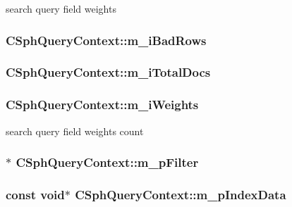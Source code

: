 search query field weights 

\hypertarget{classCSphQueryContext_a09e4f76edfe5453c46d72873b694cfff}{
\subsubsection[{m\-\_\-i\-Bad\-Rows}]{ C\-Sph\-Query\-Context\-::m\-\_\-i\-Bad\-Rows}}\label{classCSphQueryContext_a09e4f76edfe5453c46d72873b694cfff}
\hypertarget{classCSphQueryContext_ac04374526c69e45a7bc7a0547e9cb153}{
\subsubsection[{m\-\_\-i\-Total\-Docs}]{ C\-Sph\-Query\-Context\-::m\-\_\-i\-Total\-Docs}}\label{classCSphQueryContext_ac04374526c69e45a7bc7a0547e9cb153}
\hypertarget{classCSphQueryContext_a02ad4d2f26c2e5bea1c44343aab35284}{
\subsubsection[{m\-\_\-i\-Weights}]{ C\-Sph\-Query\-Context\-::m\-\_\-i\-Weights}}\label{classCSphQueryContext_a02ad4d2f26c2e5bea1c44343aab35284}


search query field weights count 

\hypertarget{classCSphQueryContext_a64ea660caf0c74b4416b30ea4faaa656}{
\subsubsection[{m\-\_\-p\-Filter}]{$\ast$ C\-Sph\-Query\-Context\-::m\-\_\-p\-Filter}}\label{classCSphQueryContext_a64ea660caf0c74b4416b30ea4faaa656}
\hypertarget{classCSphQueryContext_a57d27f825ca837d923ec7ef70fde7bd2}{
\subsubsection[{m\-\_\-p\-Index\-Data}]{\setlength{\rightskip}{0pt plus 5cm}const void$\ast$ C\-Sph\-Query\-Context\-::m\-\_\-p\-Index\-Data}}\label{classCSphQueryContext_a57d27f825ca837d923ec7ef70fde7bd2}


